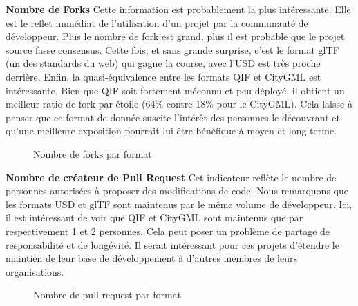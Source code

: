 \textbf{Nombre de Forks}
Cette information est probablement la plus intéressante. Elle est le reflet immédiat de l'utilisation d'un projet par la communauté de développeur. Plus le nombre de fork est grand, plus il est probable que le projet source fasse consensus. 
Cette fois, et sans grande surprise, c'est le format glTF (un des standards du web) qui gagne la course, avec l'USD est très proche derrière. 
Enfin, la quasi-équivalence entre les formats QIF et CityGML est intéressante. Bien que QIF soit fortement méconnu et peu déployé, il obtient un meilleur ratio de fork par étoile (64\% contre 18\% pour le CityGML). Cela laisse à penser que ce format de donnée suscite l'intérêt des personnes le découvrant et qu'une meilleure exposition pourrait lui être bénéfique à moyen et long terme.

\begin{figure}[!h]
    \centering
    \caption{Nombre de forks par format}
    \label{fig:mon_graphique}
\end{figure}

\textbf{Nombre de créateur de Pull Request}
Cet indicateur reflète le nombre de personnes autorisées à proposer des modifications de code.
Nous remarquons que les formats USD et glTF sont maintenus par le même volume de développeur. 
Ici, il est intéressant de voir que QIF et CityGML sont maintenus que par respectivement 1 et 2 personnes. Cela peut poser un problème de partage de responsabilité et de longévité. Il serait intéressant pour ces projets d'étendre le maintien de leur base de développement à d'autres membres de leurs organisations.

\begin{figure}[!h]
    \centering
    \caption{Nombre de pull request par format}
    \label{fig:mon_graphique}
\end{figure}

